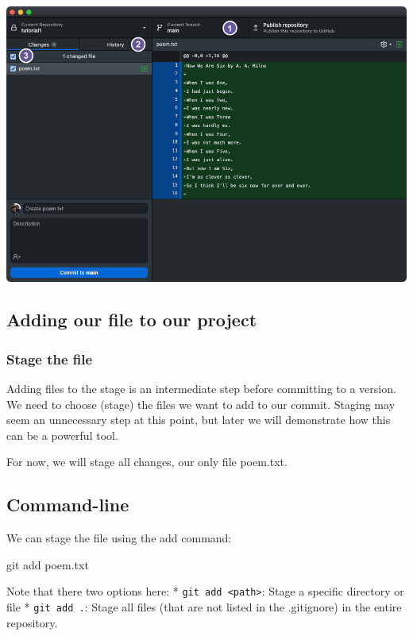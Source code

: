 \documentclass[
  letterpaper,
  DIV=11,
  numbers=noendperiod]{scrartcl}
\newenvironment{Shaded}{\begin{snugshade}}{\end{snugshade}}
\newcommand{\NormalTok}[1]{\textcolor[rgb]{0.00,0.23,0.31}{#1}}
\begin{document}
\includegraphics{images/image9.png}

\subsection{Adding our file to our
project}\label{adding-our-file-to-our-project}

\subsubsection{Stage the file}\label{stage-the-file}

Adding files to the stage is an intermediate step before committing to a
version. We need to choose (stage) the files we want to add to our
commit. Staging may seem an unnecessary step at this point, but later we
will demonstrate how this can be a powerful tool.

For now, we will stage all changes, our only file poem.txt.

\subsection{Command-line}

We can stage the file using the add command:

\begin{Shaded}
\begin{Highlighting}[]
\NormalTok{git add poem.txt}
\end{Highlighting}
\end{Shaded}

Note that there two options here: *
\texttt{git\ add\ \textless{}path\textgreater{}}: Stage a specific
directory or file * \texttt{git\ add\ .}: Stage all files (that are not
listed in the .gitignore) in the entire repository.
\end{document}
